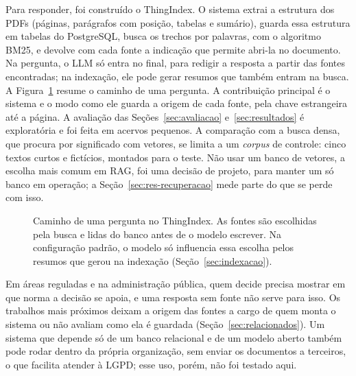 \documentclass[12pt]{article}
\newcommand{\fonte}{\par\vspace{3pt}{\footnotesize Fonte: o autor.}\par}
\begin{document}
Para responder, foi construído o ThingIndex. O sistema extrai a estrutura dos PDFs (páginas, parágrafos com posição, tabelas e sumário), guarda essa estrutura em tabelas do PostgreSQL, busca os trechos por palavras, com o algoritmo BM25, e devolve com cada fonte a indicação que permite abri-la no documento. Na pergunta, o LLM só entra no final, para redigir a resposta a partir das fontes encontradas; na indexação, ele pode gerar resumos que também entram na busca. A Figura~\ref{fig:fluxo} resume o caminho de uma pergunta. A contribuição principal é o sistema e o modo como ele guarda a origem de cada fonte, pela chave estrangeira até a página. A avaliação das Seções~\ref{sec:avaliacao} e~\ref{sec:resultados} é exploratória e foi feita em acervos pequenos. A comparação com a busca densa, que procura por significado com vetores, se limita a um \emph{corpus} de controle: cinco textos curtos e fictícios, montados para o teste. Não usar um banco de vetores, a escolha mais comum em RAG, foi uma decisão de projeto, para manter um só banco em operação; a Seção~\ref{sec:res-recuperacao} mede parte do que se perde com isso.

\begin{figure}[!htbp]
\centering
\small
{}
\caption{Caminho de uma pergunta no ThingIndex. As fontes são escolhidas pela busca e lidas do banco antes de o modelo escrever. Na configuração padrão, o modelo só influencia essa escolha pelos resumos que gerou na indexação (Seção~\ref{sec:indexacao}).}
\label{fig:fluxo}
\fonte
\end{figure}

Em áreas reguladas e na administração pública, quem decide precisa mostrar em que norma a decisão se apoia, e uma resposta sem fonte não serve para isso. Os trabalhos mais próximos deixam a origem das fontes a cargo de quem monta o sistema ou não avaliam como ela é guardada (Seção~\ref{sec:relacionados}). Um sistema que depende só de um banco relacional e de um modelo aberto também pode rodar dentro da própria organização, sem enviar os documentos a terceiros, o que facilita atender à LGPD; esse uso, porém, não foi testado aqui.
\end{document}
